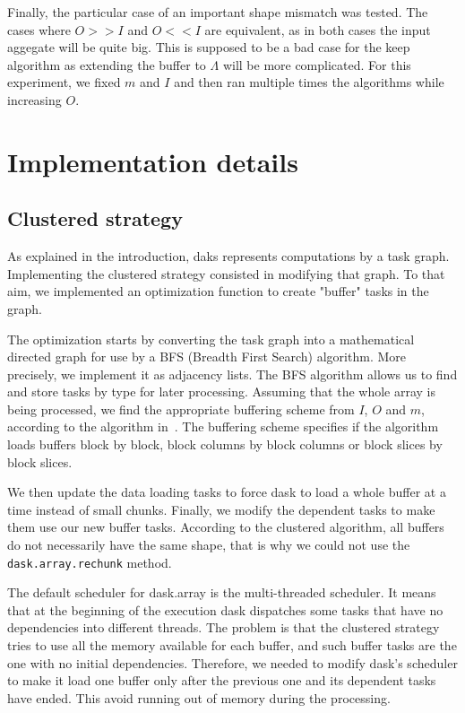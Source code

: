 \documentclass[conference]{IEEEtran}
\begin{document}
Finally, the particular case of an important shape mismatch was tested. The cases
where $O>>I$ and $O<<I$ are equivalent, as in both cases the input aggegate
will be quite big. This is supposed to be a bad case for the keep algorithm
as extending the buffer to $\Lambda$ will be more complicated. For this
experiment, we fixed $m$ and $I$ and then ran multiple times the algorithms
while increasing $O$.

\section{Implementation details}

\subsection{Clustered strategy}

As explained in the introduction, daks represents computations by a task graph.
Implementing the clustered strategy consisted in modifying that graph. To that
aim, we implemented an optimization function to create "buffer" tasks in the
graph.

The optimization starts by converting the task graph into a mathematical
directed graph for use by a BFS (Breadth First Search) algorithm. More
precisely, we implement it as adjacency lists. The BFS algorithm allows us to
find and store tasks by type for later processing. Assuming that the whole array
is being processed, we find the appropriate buffering scheme from $I$, $O$ and
$m$, according to the algorithm in~\cite{seqalgorithms}. The buffering scheme
specifies if the algorithm loads buffers block by block, block columns by
block columns or block slices by block slices.

We then update the data loading tasks to force dask to load a whole buffer at
a time instead of small chunks. Finally, we modify the dependent tasks to make
them use our new buffer tasks. According to the clustered algorithm, all buffers
do not necessarily have the same shape, that is why we could not use the
\texttt{dask.array.rechunk} method.

The default scheduler for dask.array is the multi-threaded scheduler. It means
that at the beginning of the execution dask dispatches some tasks that have
no dependencies into different threads. The problem is that the clustered
strategy tries to use all the memory available for each buffer, and such buffer
tasks are the one with no initial dependencies. Therefore, we needed to
modify dask's scheduler to make it load one buffer only after the previous one
and its dependent tasks have ended. This avoid running out of memory during the
processing.
\end{document}

